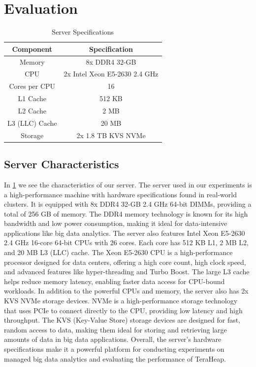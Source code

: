 \section{Evaluation}
\label{sec:eval}

\begin{table}[t!]
  \centering
  \caption{Server Specifications}
  \label{tab:server-specs}
  \begin{tabular}{|c|c|}
    \hline
    \textbf{Component} & \textbf{Specification} \\
    \hline
    Memory & 8x DDR4 32-GB \\
    CPU & 2x Intel Xeon E5-2630 2.4 GHz \\
    Cores per CPU & 16 \\
    L1 Cache & 512 KB \\
    L2 Cache & 2 MB \\
    L3 (LLC) Cache & 20 MB \\
    Storage & 2x 1.8 TB KVS NVMe \\
    \hline
  \end{tabular}
\end{table}

\subsection{Server Characteristics}
In \ref{tab:server-specs} we see the characteristics of our server.
The server used in our experiments is a high-performance machine with
hardware specifications found in real-world clusters.
It is equipped with 8x DDR4 32-GB 2.4 GHz 64-bit DIMMs, providing a
total of 256 GB of memory. The DDR4 memory technology is known for its
high bandwidth and low power consumption, making it ideal for
data-intensive applications like big data analytics. The server also
features Intel Xeon E5-2630 2.4 GHz 16-core 64-bit CPUs with 26 cores. 
Each core has 512 KB L1, 2 MB L2, and 20 MB L3 (LLC) cache.
The Xeon E5-2630 CPU is a high-performance processor designed for data
centers, offering a high core count, high clock speed, and advanced
features like hyper-threading and Turbo Boost. The large L3 cache
helps reduce memory latency, enabling faster data access for CPU-bound
workloads. In addition to the powerful CPUs and memory, the server
also has 2x KVS NVMe storage devices. NVMe is a high-performance
storage technology that uses PCIe to connect directly to the CPU,
providing low latency and high throughput. The KVS (Key-Value Store)
storage devices are designed for fast, random access to data, making
them ideal for storing and retrieving large amounts of data in big
data applications. Overall, the server's hardware specifications make
it a powerful platform for conducting experiments on managed big data
analytics and evaluating the performance of TeraHeap.

